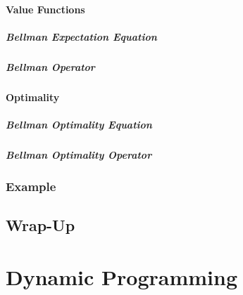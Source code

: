             \subsubsection{Value Functions} %

                \paragraph{Bellman Expectation Equation} %

                \paragraph{Bellman Operator} %

            \subsubsection{Optimality} %

                \paragraph{Bellman Optimality Equation} %

                \paragraph{Bellman Optimality Operator} %

        \subsection{Example} %

    \section{Wrap-Up} %

\chapter{Dynamic Programming} %

